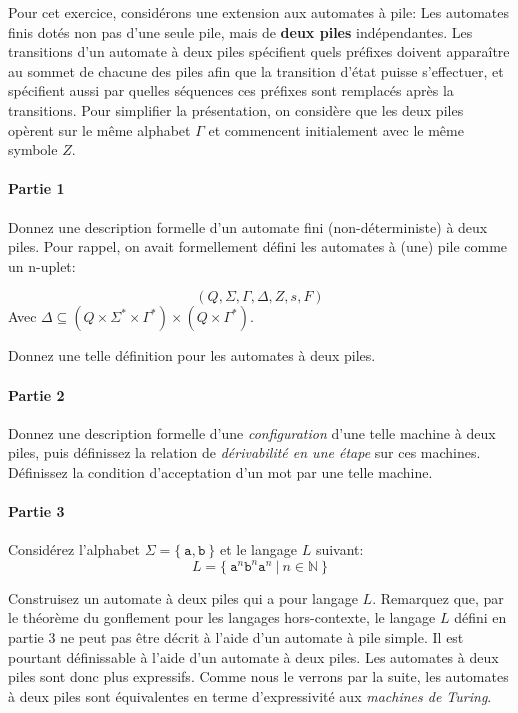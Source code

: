 \documentclass[12pt,french,a4paper]{article}
\begin{document}
\begin{question}
Pour cet exercice, considérons une extension aux automates à pile:
Les automates finis dotés non pas d'une seule pile, mais de \textbf{deux piles} indépendantes.
Les transitions d'un automate à deux piles spécifient quels préfixes doivent apparaître au sommet de chacune des piles afin que la transition d'état puisse s'effectuer, et spécifient aussi par quelles séquences ces préfixes sont remplacés après la transitions.
Pour simplifier la présentation, on considère que les deux piles opèrent sur le même alphabet $\Gamma$ et commencent initialement avec le même symbole $Z$.

\paragraph{Partie 1}

Donnez une description formelle d'un automate fini (non-déterministe) à deux piles.
Pour rappel, on avait formellement défini les automates à (une) pile comme un n-uplet:

\[
(Q, \Sigma, \Gamma, \Delta, Z, s, F)
\]
Avec $\Delta \subseteq (Q \times \Sigma^* \times \Gamma^*) \times (Q \times \Gamma^*)$.

Donnez une telle définition pour les automates à deux piles.

\paragraph{Partie 2}

Donnez une description formelle d'une \textit{configuration} d'une telle machine à deux piles, puis définissez la relation de \textit{dérivabilité en une étape} sur ces machines. Définissez la condition d'acceptation d'un mot par une telle machine.

\paragraph{Partie 3}

Considérez l'alphabet $\Sigma = \{\ \texttt{a}, \texttt{b}\ \}$ et le langage $L$ suivant:
\[
L = \{\ \texttt{a}^n\texttt{b}^n\texttt{a}^n\ |\ n \in \mathbb{N} \ \}
\]
\end{question}

Construisez un automate à deux piles qui a pour langage $L$.
Remarquez que, par le théorème du gonflement pour les langages hors-contexte, le langage $L$ défini en partie 3 ne peut pas être décrit à l'aide d'un automate à pile simple. Il est pourtant définissable à l'aide d'un automate à deux piles.
Les automates à deux piles sont donc plus expressifs.
Comme nous le verrons par la suite, les automates à deux piles sont équivalentes en terme d'expressivité aux \textit{machines de Turing}.
\end{document}
